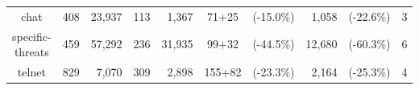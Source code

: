 \begin{frame}
\begin{centering}
\begin{tabular}{c|rr|rr|crrrc}
          chat             & \hspace*{0.5em}408\hspace*{0.5em} & 23,937\hspace*{0.5em} & \hspace*{0.5em}113\hspace*{0.5em}   & 1,367\hspace*{0.5em}  & 71+25\hspace*{-0.5em}  & (-15.0\%) & \hspace*{0.5em}1,058  & (-22.6\%) & 3\\
          \rowcolor{yellow}specific-threats & \hspace*{0.5em}459\hspace*{0.5em} & 57,292\hspace*{0.5em} & \hspace*{0.5em}236\hspace*{0.5em}  & 31,935\hspace*{0.5em} & 99+32\hspace*{-0.5em}   & (-44.5\%) & \hspace*{0.5em}12,680 & (-60.3\%) & 6\\
          telnet           & \hspace*{0.5em}829\hspace*{0.5em} & 7,070\hspace*{0.5em}  & \hspace*{0.5em}309\hspace*{0.5em}   & 2,898\hspace*{0.5em}  & 155+82                 & (-23.3\%) & \hspace*{0.5em}2,164  & (-25.3\%) & 4\\
        \end{tabular}
    \end{centering}
\end{frame}


